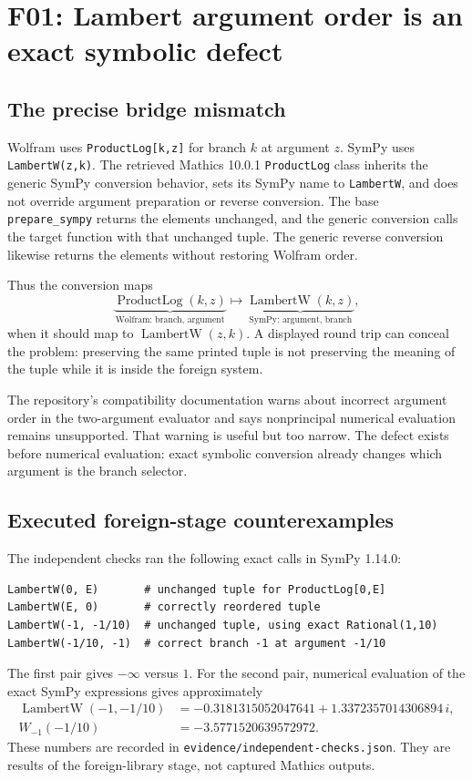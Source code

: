 \documentclass[11pt,letterpaper]{article}
\newcommand{\code}[1]{\texttt{#1}}
\begin{document}
\section{F01: Lambert argument order is an exact symbolic defect}
\label{sec:f01}

\subsection{The precise bridge mismatch}

Wolfram uses \code{ProductLog[k,z]} for branch $k$ at argument $z$. SymPy uses \code{LambertW(z,k)}. The retrieved Mathics 10.0.1 \code{ProductLog} class inherits the generic SymPy conversion behavior, sets its SymPy name to \code{LambertW}, and does not override argument preparation or reverse conversion. The base \code{prepare\_sympy} returns the elements unchanged, and the generic conversion calls the target function with that unchanged tuple. The generic reverse conversion likewise returns the elements without restoring Wolfram order.~\cite{mathics-productlog,mathics-builtin,sympy-elementary}

Thus the conversion maps
\[
 \underbrace{\operatorname{ProductLog}(k,z)}_{\text{Wolfram: branch, argument}}
 \longmapsto
 \underbrace{\operatorname{LambertW}(k,z)}_{\text{SymPy: argument, branch}},
\]
when it should map to $\operatorname{LambertW}(z,k)$. A displayed round trip can conceal the problem: preserving the same printed tuple is not preserving the meaning of the tuple while it is inside the foreign system.

The repository's compatibility documentation warns about incorrect argument order in the two-argument evaluator and says nonprincipal numerical evaluation remains unsupported. That warning is useful but too narrow. The defect exists before numerical evaluation: exact symbolic conversion already changes which argument is the branch selector.~\cite{compat,mathics-core}

\subsection{Executed foreign-stage counterexamples}

The independent checks ran the following exact calls in SymPy 1.14.0:
\begin{lstlisting}
LambertW(0, E)       # unchanged tuple for ProductLog[0,E]
LambertW(E, 0)       # correctly reordered tuple
LambertW(-1, -1/10)  # unchanged tuple, using exact Rational(1,10)
LambertW(-1/10, -1)  # correct branch -1 at argument -1/10
\end{lstlisting}
The first pair gives $-\infty$ versus $1$. For the second pair, numerical evaluation of the exact SymPy expressions gives approximately
\begin{align*}
 \operatorname{LambertW}(-1,-1/10)
   &=-0.3181315052047641+1.3372357014306894\,i,\\
 W_{-1}(-1/10)&=-3.5771520639572972.
\end{align*}
These numbers are recorded in \code{evidence/independent-checks.json}. They are results of the foreign-library stage, not captured Mathics outputs.
\end{document}
